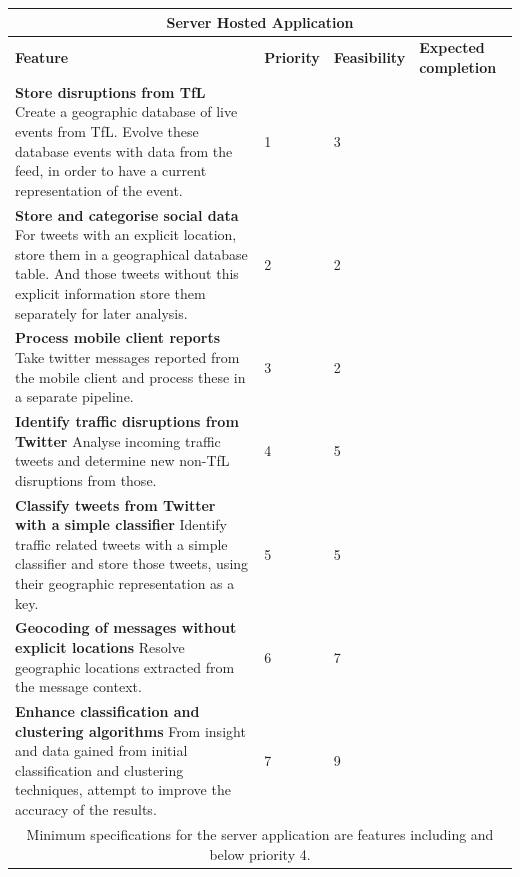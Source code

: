 \begin{center}
\begin{tabular}{ | p{8.4cm} | p{1.8cm} | p{1.8cm} | p{2.2cm} | }
\hline
\multicolumn{4}{|c|}{\textbf{Server Hosted Application}} \\ \hline
\textbf{Feature} & \textbf{Priority} & \textbf{Feasibility} & \textbf{Expected completion} \\ \hline
\textbf{Store disruptions from TfL} \newline
Create a geographic database of live events from TfL. Evolve these database events with data from the feed, in order to have a current representation of the event. & 1 & 3 & \\ \hline
\textbf{Store and categorise social data} \newline
For tweets with an explicit location, store them in a geographical database
table. And those tweets without this explicit information store them separately for later
analysis. & 2 & 2 & \\ \hline
\textbf{Process mobile client reports} \newline
Take twitter messages reported from the mobile client and process these in a
separate pipeline. & 3 & 2 & \\ \hline
\textbf{Identify traffic disruptions from Twitter} \newline
Analyse incoming traffic tweets and determine new non-TfL disruptions from
those. & 4 & 5 & \\ \hline
\textbf{Classify tweets from Twitter with a simple classifier} \newline
Identify traffic related tweets with a simple classifier and store those
tweets, using their geographic representation as a key. & 5 & 5 & \\ \hline
\textbf{Geocoding of messages without explicit locations} \newline
Resolve geographic locations extracted from the message context. & 6 & 7 & \\ \hline
\textbf{Enhance classification and clustering algorithms} \newline
From insight and data gained from initial classification and clustering
techniques, attempt to improve the accuracy of the results. & 7 & 9 & \\ \hline
\multicolumn{4}{|c|}{Minimum specifications for the server application are
features including and below priority 4.} \\ \hline
\end{tabular}
\end{center}
